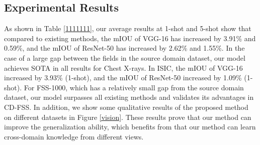 \documentclass{bmvc2k}
\begin{document}
\subsection{Experimental Results}
As shown in Table \ref{1111111}, our average results at 1-shot and 5-shot show that compared to existing methods, the mIOU of VGG-16 has increased by 3.91\% and 0.59\%, and the mIOU of ResNet-50 has increased by 2.62\% and 1.55\%.
In the case of a large gap between the fields in the source domain dataset, our model achieves SOTA in all results for Chest X-rays.
In ISIC, the mIOU of VGG-16 increased by 3.93\% (1-shot), and the mIOU of ResNet-50 increased by 1.09\% (1-shot).
For FSS-1000, which has a relatively small gap from the source domain dataset, our model surpasses all existing methods and validates its advantages in CD-FSS.
In addition, we show some qualitative results of the proposed method on different datasets in Figure \ref{vision}.
These results prove that our method can improve the generalization ability, which benefits from that our method can learn cross-domain knowledge from different views.
\end{document}
